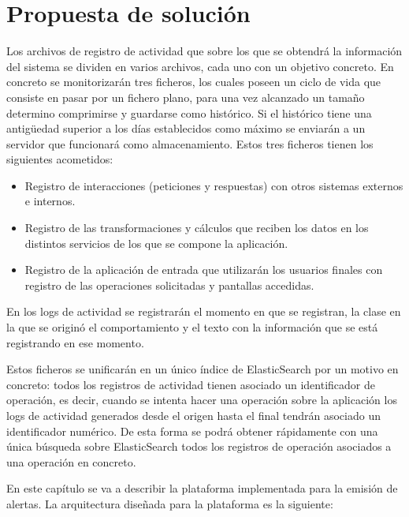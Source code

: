 \chapter{Propuesta de solución}


Los archivos de registro de actividad que sobre los que se obtendrá la información del sistema se dividen en varios archivos, cada uno con un objetivo concreto. En concreto se monitorizarán tres ficheros, los cuales poseen un ciclo de vida que consiste en pasar por un fichero plano, para una vez alcanzado un tamaño determino comprimirse y guardarse como histórico. Si el histórico tiene una antigüedad superior a los días establecidos como máximo se enviarán a un servidor que funcionará como almacenamiento. Estos tres ficheros tienen los siguientes acometidos:

\begin{itemize}
\item Registro de interacciones (peticiones y respuestas) con otros sistemas externos e internos.
\item Registro de las transformaciones y cálculos que reciben los datos en los distintos servicios de los que se compone la aplicación.
\item Registro de la aplicación de entrada que utilizarán los usuarios finales con registro de las operaciones solicitadas y pantallas accedidas.
\end{itemize}

En los logs de actividad se registrarán el momento en que se registran, la clase en la que se originó el comportamiento y el texto con la información que se está registrando en ese momento. 

Estos ficheros se unificarán en un único índice de ElasticSearch por un motivo en concreto: todos los registros de actividad tienen asociado un identificador de operación, es decir, cuando se intenta hacer una operación sobre la aplicación los logs de actividad generados desde el origen hasta el final tendrán asociado un identificador numérico. De esta forma se podrá obtener rápidamente con una única búsqueda sobre ElasticSearch todos los registros de operación asociados a una operación en concreto.


En este capítulo se va a describir la plataforma implementada para la emisión de alertas. La arquitectura diseñada para la plataforma es la siguiente:

